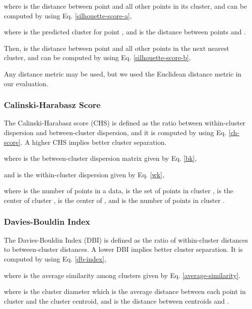 \documentclass[conference]{IEEEtran}
\begin{document}
where  is the distance between point  and all other points in its cluster, and can be computed by using Eq. \ref{silhouette-score-a},

where  is the predicted cluster for point , and  is the distance between points  and .

Then,  is the distance between point  and all other points in the next nearest cluster, and can be computed by using Eq. \ref{silhouette-score-b},

Any distance metric may be used, but we used the Euclidean distance metric in our evaluation.

\subsubsection{Calinski-Harabasz Score} The Calinski-Harabasz score\cite{calinski1974dendrite} (CHS) is defined as the ratio between within-cluster dispersion and between-cluster dispersion, and it is computed by using Eq. \ref{ch-score}. A higher CHS implies better cluster separation.

where  is the between-cluster dispersion matrix given by Eq. \ref{bk},

and  is the within-cluster dispersion given by Eq. \ref{wk},

where  is the number of points in a data,  is the set of points in cluster ,  is the center of cluster ,  is the center of , and  is the number of points in cluster .

\subsubsection{Davies-Bouldin Index} The Davies-Bouldin Index (DBI) is defined as the ratio of within-cluster distances to between-cluster distances\cite{davies1979cluster, halkidi2001clustering}. A lower DBI implies better cluster separation. It is computed by using Eq. \ref{db-index},

\indent where  is the average similarity among clusters given by Eq. \ref{average-similarity}.

\indent where  is the cluster diameter which is the average distance between each point in cluster  and the cluster centroid, and  is the distance between centroids  and .
\end{document}
